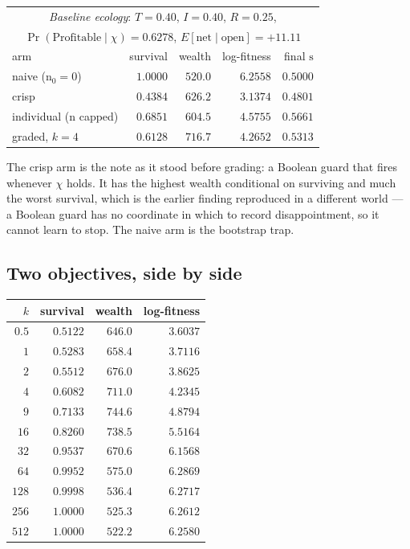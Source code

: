 \documentclass[11pt,a4paper]{article}
\theoremstyle{plain}
\theoremstyle{definition}
\theoremstyle{remark}
\newcommand{\str}{\mathrm{s}}
\newcommand{\ev}{\mathrm{n}}
\begin{document}
\begin{center}
\begin{tabular}{lrrrr}
\multicolumn{5}{c}{\emph{Baseline ecology}: $T = 0.40$, $I = 0.40$, $R = 0.25$,}\\
\multicolumn{5}{c}{$\Pr(\mathrm{Profitable}\mid\chi) = 0.6278$,
$E[\text{net}\mid\text{open}] = +11.11$}\\[4pt]
\toprule
arm & survival & wealth & log-fitness & final $\str$ \\
\midrule
naive ($\ev_0 = 0$) & $1.0000$ & $520.0$ & $6.2558$ & $0.5000$ \\
crisp & $0.4384$ & $626.2$ & $3.1374$ & $0.4801$ \\
individual ($\ev$ capped) & $0.6851$ & $604.5$ & $4.5755$ & $0.5661$ \\
graded, $k=4$ & $0.6128$ & $716.7$ & $4.2652$ & $0.5313$ \\
\bottomrule
\end{tabular}
\end{center}

\smallskip
\noindent The crisp arm is the note as it stood before grading: a Boolean guard
that fires whenever $\chi$ holds. It has the highest wealth conditional on
surviving and much the worst survival, which is the earlier finding reproduced in
a different world --- a Boolean guard has no coordinate in which to record
disappointment, so it cannot learn to stop. The naive arm is the bootstrap trap.

\subsection{Two objectives, side by side}

\begin{center}
\begin{tabular}{rrrr}
\toprule
$k$ & survival & wealth & log-fitness \\
\midrule
$0.5$ & $0.5122$ & $646.0$ & $3.6037$ \\
$1$ & $0.5283$ & $658.4$ & $3.7116$ \\
$2$ & $0.5512$ & $676.0$ & $3.8625$ \\
$4$ & $0.6082$ & $711.0$ & $4.2345$ \\
$9$ & $0.7133$ & $\mathbf{744.6}$ & $4.8794$ \\
$16$ & $0.8260$ & $738.5$ & $5.5164$ \\
$32$ & $0.9537$ & $670.6$ & $6.1568$ \\
$64$ & $0.9952$ & $575.0$ & $\mathbf{6.2869}$ \\
$128$ & $0.9998$ & $536.4$ & $6.2717$ \\
$256$ & $1.0000$ & $525.3$ & $6.2612$ \\
$512$ & $1.0000$ & $522.2$ & $6.2580$ \\
\bottomrule
\end{tabular}
\end{center}
\end{document}
